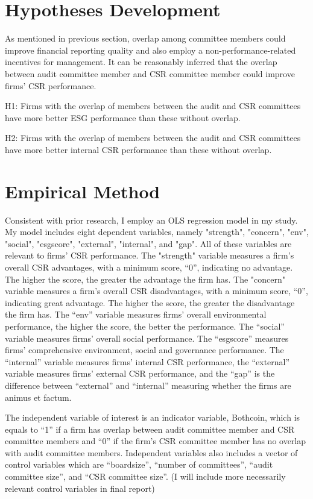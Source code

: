 \documentclass{article}
\begin{document}
\section{Hypotheses Development}
As mentioned in previous section, overlap among committee members could improve financial reporting quality and also employ a non-performance-related incentives for management. It can be reasonably inferred that the overlap between audit committee member and CSR committee member could improve firms' CSR performance. 

H1: Firms with the overlap of members between the audit and CSR committees have more better ESG performance than these without overlap. 

H2: Firms with the overlap of members between the audit and CSR committees have more better internal CSR performance than these without overlap.

\section{Empirical Method}
Consistent with prior research, I employ an OLS regression model in my study. My model includes eight dependent variables, namely "strength", "concern", "env", "social", "esgscore", "external", "internal", and "gap". All of these variables are relevant to firms' CSR performance. The "strength" variable measures a firm's overall CSR advantages, with a minimum score, “0”, indicating no advantage. The higher the score, the greater the advantage the firm has. The "concern" variable measures a firm’s overall CSR disadvantages, with a minimum score, “0”, indicating great advantage. The higher the score, the greater the disadvantage the firm has. The “env” variable measures firms’ overall environmental performance, the higher the score, the better the performance. The “social” variable measures firms’ overall social performance. The “esgscore” measures firms’ comprehensive environment, social and governance performance. The “internal” variable measures firms’ internal CSR performance, the “external” variable measures firms’ external CSR performance, and the “gap” is the difference between “external” and “internal” measuring whether the firms are animus et factum.

The independent variable of interest is an indicator variable, Bothcoin, which is equals to “1” if a firm has overlap between audit committee member and CSR committee members and “0” if the firm’s CSR committee member has no overlap with audit committee members. Independent variables also includes a vector of control variables which are “boardsize”, “number of committees”, “audit committee size”, and “CSR committee size”. (I will include more necessarily relevant control variables in final report)
\end{document}
